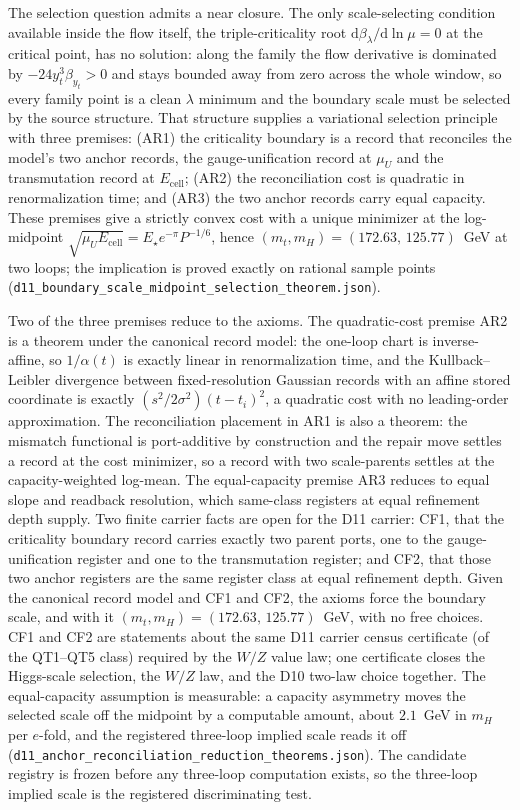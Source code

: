 \documentclass[11pt]{article}
\begin{document}
The selection question admits a near closure.  The only scale-selecting
condition available inside the flow itself, the triple-criticality root
\(\mathrm d\beta_\lambda/\mathrm d\ln\mu=0\) at the critical point, has no
solution: along the family the flow derivative is dominated by
\(-24y_t^3\beta_{y_t}>0\) and stays bounded away from zero across the whole
window, so every family point is a clean \(\lambda\) minimum and the
boundary scale must be selected by the source structure.  That structure
supplies a variational selection principle with three premises: (AR1) the
criticality boundary is a record that reconciles the model's two anchor
records, the gauge-unification record at \(\mu_U\) and the transmutation
record at \(E_{\mathrm{cell}}\); (AR2) the reconciliation cost is quadratic
in renormalization time; and (AR3) the two anchor records carry equal
capacity.  These premises give a strictly convex cost with a unique minimizer
at the log-midpoint \(\sqrt{\mu_U E_{\mathrm{cell}}}=E_\star e^{-\pi}P^{-1/6}\),
hence \((m_t,m_H)=(172.63,\,125.77)\)~GeV at two loops; the implication is
proved exactly on rational sample points
(\texttt{d11\_boundary\_scale\_midpoint\_selection\_theorem.json}).

Two of the three premises reduce to the axioms.  The quadratic-cost premise
AR2 is a theorem under the canonical record model: the one-loop chart is
inverse-affine, so \(1/\alpha(t)\) is exactly linear in renormalization time,
and the Kullback--Leibler divergence between fixed-resolution Gaussian records
with an affine stored coordinate is exactly
\((s^2/2\sigma^2)(t-t_i)^2\), a quadratic cost with no leading-order
approximation.  The reconciliation placement in AR1 is also a theorem: the
mismatch functional is port-additive by construction and the repair move
settles a record at the cost minimizer, so a record with two scale-parents
settles at the capacity-weighted log-mean.  The equal-capacity premise AR3
reduces to equal slope and readback resolution, which same-class registers at
equal refinement depth supply. Two finite carrier facts are open for
the D11 carrier: CF1, that the criticality boundary record carries exactly two
parent ports, one to the gauge-unification register and one to the
transmutation register; and CF2, that those two anchor registers are the same
register class at equal refinement depth.  Given the canonical record model and
CF1 and CF2, the axioms force the boundary scale, and with it
\((m_t,m_H)=(172.63,\,125.77)\)~GeV, with no free choices. CF1 and CF2 are
statements about the same D11 carrier census certificate (of the QT1--QT5
class) required by the \(W/Z\) value law; one certificate closes the
Higgs-scale selection, the \(W/Z\) law, and the D10 two-law choice together.
The equal-capacity assumption is measurable: a capacity asymmetry moves the
selected scale off the midpoint by a computable amount, about \(2.1\)~GeV in
\(m_H\) per \(e\)-fold, and the registered three-loop implied scale reads it off
(\texttt{d11\_anchor\_reconciliation\_reduction\_theorems.json}).  The candidate
registry is frozen before any three-loop computation exists, so the three-loop
implied scale is the registered discriminating test.
\end{document}
